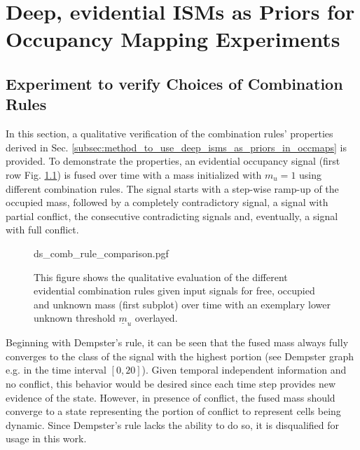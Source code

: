 \chapter{Deep, evidential ISMs as Priors for Occupancy Mapping Experiments}
\label{ch:deep_ev_isms_as_prior_for_occmaps_exp}
%
\section{Experiment to verify Choices of Combination Rules}
\label{sec:exp_choice_comb_rule}
In this section, a qualitative verification of the combination rules' properties derived in Sec. \ref{subsec:method_to_use_deep_isms_as_priors_in_occmaps} is provided. To demonstrate the properties, an evidential occupancy signal (first row Fig. \ref{fig:ds_comb_rule_comparison}) is fused over time with a mass initialized with $m_u = 1$ using different combination rules. The signal starts with a step-wise ramp-up of the occupied mass, followed by a completely contradictory signal, a signal with partial conflict, the consecutive contradicting signals and, eventually, a signal with full conflict.
\begin{figure}[H]
	\begin{center}
		{ds_comb_rule_comparison.pgf}
		\caption{\label{fig:ds_comb_rule_comparison}This figure shows the qualitative evaluation of the different evidential combination rules given input signals for free, occupied and unknown mass (first subplot) over time with an exemplary lower unknown threshold $\underline{m}_u$ overlayed.}
	\end{center}
\end{figure} 
Beginning with Dempster's rule, it can be seen that the fused mass always fully converges to the class of the signal with the highest portion (see Dempster graph e.g. in the time interval $[0, 20]$). Given temporal independent information and no conflict, this behavior would be desired since each time step provides new evidence of the state. However, in presence of conflict, the fused mass should converge to a state representing the portion of conflict to represent cells being dynamic. Since Dempster's rule lacks the ability to do so, it is disqualified for usage in this work.

